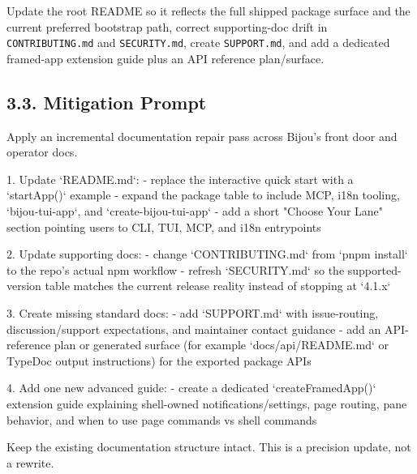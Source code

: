 Update the root README so it reflects the full shipped package surface and the current preferred bootstrap path, correct supporting-doc drift in \texttt{C\allowbreak{}O\allowbreak{}N\allowbreak{}T\allowbreak{}R\allowbreak{}I\allowbreak{}B\allowbreak{}U\allowbreak{}T\allowbreak{}I\allowbreak{}N\allowbreak{}G\allowbreak{}.\allowbreak{}m\allowbreak{}d} and \texttt{S\allowbreak{}E\allowbreak{}C\allowbreak{}U\allowbreak{}R\allowbreak{}I\allowbreak{}T\allowbreak{}Y\allowbreak{}.\allowbreak{}m\allowbreak{}d}, create \texttt{S\allowbreak{}U\allowbreak{}P\allowbreak{}P\allowbreak{}O\allowbreak{}R\allowbreak{}T\allowbreak{}.\allowbreak{}m\allowbreak{}d}, and add a dedicated framed-app extension guide plus an API reference plan/surface.

\subsection{3.3. Mitigation Prompt}\label{record-417-mitigation-prompt}

\begin{CodeBlock}
Apply an incremental documentation repair pass across Bijou's front door and operator docs.

1. Update `README.md`:
   - replace the interactive quick start with a `startApp()` example
   - expand the package table to include MCP, i18n tooling, `bijou-tui-app`, and `create-bijou-tui-app`
   - add a short "Choose Your Lane" section pointing users to CLI, TUI, MCP, and i18n entrypoints

2. Update supporting docs:
   - change `CONTRIBUTING.md` from `pnpm install` to the repo's actual npm workflow
   - refresh `SECURITY.md` so the supported-version table matches the current release reality instead of stopping at `4.1.x`

3. Create missing standard docs:
   - add `SUPPORT.md` with issue-routing, discussion/support expectations, and maintainer contact guidance
   - add an API-reference plan or generated surface (for example `docs/api/README.md` or TypeDoc output instructions) for the exported package APIs

4. Add one new advanced guide:
   - create a dedicated `createFramedApp()` extension guide explaining shell-owned notifications/settings, page routing, pane behavior, and when to use page commands vs shell commands

Keep the existing documentation structure intact. This is a precision update, not a rewrite.
\end{CodeBlock}

